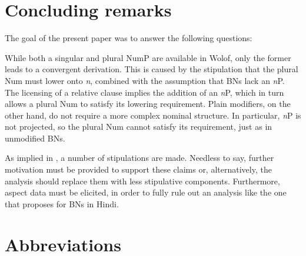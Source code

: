 \documentclass[output=paper]{langscibook}
\begin{document}
	\ea
	    \z
	\z

\section{Concluding remarks}

The goal of the present paper was to answer the following questions:

	
	
		\eanoraggedright \label{fon:qQq2444}
	\z
	\z

\noindent   While both a singular and plural NumP are available in Wolof, only the former leads to a convergent derivation. This is caused by the stipulation that the plural Num must lower onto \textit{n}, combined with the assumption that BNs lack an \textit{n}P. The licensing of a relative clause implies the addition of an \textit{n}P, which in turn allows a plural Num to satisfy its lowering requirement. Plain modifiers, on the other hand, do not require a more complex nominal structure. In particular, \textit{n}P is not projected, so the plural Num cannot satisfy its requirement, just as in unmodified BNs.

As implied in , a number of stipulations are made. Needless to say, further motivation must be provided to support these claims or, alternatively, the analysis should replace them with less stipulative components. Furthermore, aspect data must be elicited, in order to fully rule out an analysis like the one that \citet{dayal2011hindi} proposes for BNs in Hindi.

\section*{Abbreviations}
\end{document}
